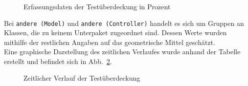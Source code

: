 \documentclass{article}
\begin{document}
\begin{figure}[H]%
    \caption{Erfassungsdaten der Testüberdeckung in Prozent}
    \label{fig:sd:Coverage_over_time_data}
\end{figure}

Bei \texttt{andere (Model)} und \texttt{andere (Controller)} handelt es sich um Gruppen an Klassen, die zu keinem Unterpaket zugeordnet sind.
Dessen Werte wurden mithilfe der restlichen Angaben auf das geometrische Mittel geschätzt.\\
Eine graphische Darstellung des zeitlichen Verlaufes wurde anhand der Tabelle erstellt und befindet sich in Abb.~\ref{fig:sd:Coverage_over_time}.

\begin{figure}[H]%
    \caption{Zeitlicher Verlauf der Testüberdeckung}
    \label{fig:sd:Coverage_over_time}
\end{figure}
\end{document}
